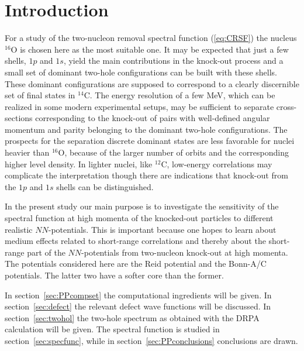 \section{Introduction}
For a study of the two-nucleon removal spectral function (\ref{eq:CRSF})
the nucleus $^{16}$O is chosen here as the most suitable one. It may be 
expected that just a few shells, $1p$ and $1s$, yield the main contributions 
in 
the knock-out process and a small set of dominant two-hole configurations can 
be built with these shells. These dominant configurations are supposed to 
correspond to a clearly discernible set of final states in $^{14}$C. 
The energy resolution of a few MeV, which can be realized in some modern 
experimental setups, may be sufficient to separate cross-sections 
corresponding to the knock-out of pairs with well-defined angular momentum and
parity belonging to the dominant two-hole configurations.
The prospects for the separation discrete dominant states are less 
favorable for 
nuclei heavier than $^{16}$O, because of the larger number of orbits and the 
corresponding higher level density. In lighter nuclei, like $^{12}$C, 
low-energy correlations may 
complicate the interpretation though there are indications that knock-out 
from the $1p$ and $1s$ shells can be distinguished\cite{Kes93}.

In the present study our main purpose is to investigate the 
sensitivity of the
spectral function at high momenta of the knocked-out particles 
to different realistic $NN$-potentials. This is important 
because one hopes\cite{Prop} to learn about 
medium effects related to short-range correlations and 
thereby about the short-range part of the $NN$-potentials from two-nucleon 
knock-out at high momenta.
The potentials considered here are the Reid potential\cite{Re68} and the 
Bonn-A/C
potentials\cite{Ma89}. The latter two have a softer core than the former.

In section~\ref{sec:PPcompset} the computational ingredients will be given. In 
section~\ref{sec:defect} the relevant defect wave functions will be 
discussed.
In section~\ref{sec:twohol} the two-hole spectrum as obtained with the DRPA 
calculation will be given. The spectral function is studied in 
section~\ref{sec:specfunc}, while in section~\ref{sec:PPconclusions} 
conclusions are drawn.
